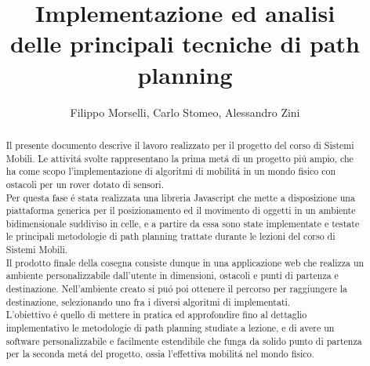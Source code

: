 \documentclass[conference]{IEEEtran}
\begin{document}
\title{Implementazione ed analisi \\ delle principali tecniche di path planning}

\author{
Filippo Morselli,
Carlo Stomeo,
Alessandro Zini
\\
}




\maketitle

\begin{abstract}
Il presente documento descrive il lavoro realizzato per il progetto del corso di Sistemi Mobili.
Le attivit\'a svolte rappresentano la prima met\'a di un progetto pi\'u ampio, che ha come scopo
l'implementazione di algoritmi di mobilit\'a in un mondo fisico con ostacoli per un rover dotato
di sensori.
\\
Per questa fase \'e stata realizzata una libreria Javascript che mette a disposizione una
piattaforma generica per il posizionamento ed il movimento di oggetti in un ambiente bidimensionale
suddiviso in celle, e a partire da essa sono state implementate e testate le principali metodologie
di path planning trattate durante le lezioni del corso di Sistemi Mobili. 
\\
Il prodotto finale della cosegna consiste dunque in una applicazione web che realizza un ambiente
personalizzabile dall'utente in dimensioni, ostacoli e punti di partenza e destinazione.
Nell'ambiente creato si pu\'o poi ottenere il percorso per raggiungere la destinazione, 
selezionando uno fra i diversi algoritmi di implementati.
\\
L'obiettivo \'e quello di mettere in pratica ed approfondire fino al dettaglio implementativo le
metodologie di path planning studiate a lezione, e di avere un software personalizzabile e 
facilmente estendibile che funga da solido punto di partenza per la seconda met\'a del progetto,
ossia l'effettiva mobilit\'a nel mondo fisico.
\end{abstract}
\end{document}
